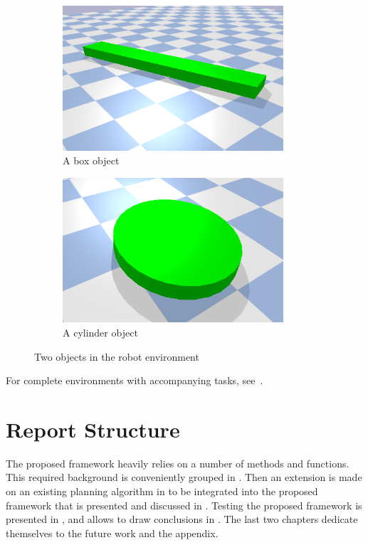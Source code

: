 \begin{figure}[H]
    \centering
    \begin{subfigure}{.5\textwidth}
    \centering
    \includegraphics[width=0.9\textwidth]{figures/introduction/box_object.png}
    \caption{A box object}
    \end{subfigure}%
    \begin{subfigure}{.5\textwidth}
    \centering
    \includegraphics[width=0.9\textwidth]{figures/introduction/cylinder_object.png}
    \caption{A cylinder object}
    \end{subfigure}%
    \caption{Two objects in the robot environment}%
    \label{fig:example_objects}
\end{figure}

For complete environments with accompanying tasks, see~.\bs

\section{Report Structure}%
\label{sec:report_structure}
The proposed framework heavily relies on a number of methods and functions. This required background is conveniently grouped in . Then an extension is made on an existing planning algorithm in  to be integrated into the proposed framework that is presented and discussed in . Testing the proposed framework is presented in , and allows to draw conclusions in . The last two chapters dedicate themselves to the future work and the appendix.\bs
